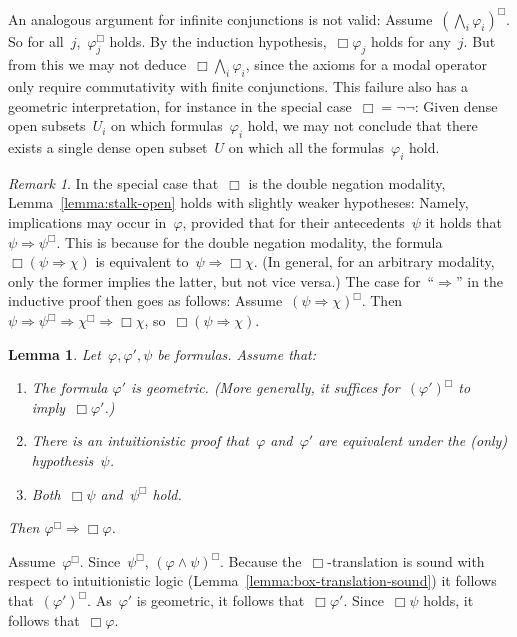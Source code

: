 \documentclass[10pt,reqno,a4paper]{amsbook}
\makeatletter
\theoremstyle{definition}
\theoremstyle{plain}
\newtheorem{lemma}[defn]{Lemma}
\theoremstyle{remark}
\newtheorem{rem}[defn]{Remark}
\newcommand{\?}{\,{:}\,}
\renewcommand{\_}{\mathpunct{.}\,}
\renewenvironment{proof}[1][\proofname]{\par
  \pushQED{\qed}%
  \normalfont \topsep6\p@\@plus6\p@\relax
  \trivlist
  \item[\hskip\labelsep
        \itshape
    #1\@addpunct{.}]\ignorespaces
}{%
  \popQED\endtrivlist\@endpefalse
}
\makeatother
\begin{document}
An analogous argument for infinite conjunctions is not valid:
Assume~$(\bigwedge_i \varphi_i)^\Box$. So for all~$j$,~$\varphi_j^\Box$ holds.
By the induction hypothesis,~$\Box\varphi_j$ holds for any~$j$. But from this
we may not deduce~$\Box\bigwedge_i \varphi_i$, since the axioms for a modal
operator only require commutativity with finite conjunctions. This failure also
has a geometric interpretation, for instance in the special case~$\Box =
\neg\neg$: Given dense open subsets~$U_i$ on which formulas~$\varphi_i$ hold,
we may not conclude that there exists a single dense open subset~$U$ on which
all the formulas~$\varphi_i$ hold.

\begin{rem}In the special case that~$\Box$ is the double negation modality,
Lemma~\ref{lemma:stalk-open} holds with slightly weaker hypotheses: Namely, implications may occur
in~$\varphi$, provided that for their antecedents~$\psi$ it holds that~$\psi
\Rightarrow \psi^\Box$. This is because for the double negation modality,
the formula~$\Box(\psi \Rightarrow \chi)$ is equivalent to~$\psi \Rightarrow
\Box\chi$. (In general, for an arbitrary modality, only the former implies the latter, but not vice versa.) The case
for~``$\Rightarrow$'' in the inductive proof then goes as follows:
Assume~$(\psi \Rightarrow \chi)^\Box$. Then~$\psi \Rightarrow \psi^\Box
\Rightarrow \chi^\Box \Rightarrow \Box\chi$, so~$\Box(\psi \Rightarrow \chi)$.
\end{rem}

\begin{lemma}\label{lemma:stalk-open-with-hypothesis}
Let~$\varphi, \varphi', \psi$ be formulas. Assume that:
\begin{enumerate}
\item The formula $\varphi'$ is geometric. (More generally, it suffices for~$(\varphi')^\Box$
to imply~$\Box\varphi'$.)
\item There is an intuitionistic proof that~$\varphi$
and~$\varphi'$ are equivalent under the (only) hypothesis~$\psi$.
\item Both~$\Box\psi$ and~$\psi^\Box$ hold.
\end{enumerate}
Then $\varphi^\Box \Rightarrow \Box\varphi$.
\end{lemma}
\begin{proof}
Assume~$\varphi^\Box$. Since~$\psi^\Box$, $(\varphi \wedge \psi)^\Box$. Because
the~$\Box$-translation is sound with respect to intuitionistic logic
(Lemma~\ref{lemma:box-translation-sound})
it follows that~$(\varphi')^\Box$. As~$\varphi'$ is geometric, it follows
that~$\Box\varphi'$. Since~$\Box\psi$ holds, it follows that~$\Box\varphi$.
\end{proof}
\end{document}
